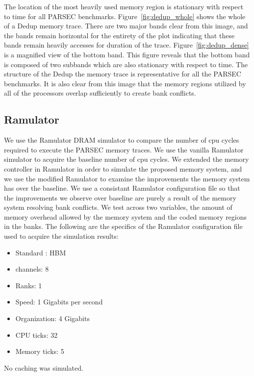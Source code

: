 The location of the most heavily used memory region is stationary with respect to time for all PARSEC benchmarks. Figure~\ref{fig:dedup_whole} shows the whole of a Dedup memory trace. There are two major bands clear from this image, and the bands remain horizontal for the entirety of the plot indicating that these bands remain heavily accesses for duration of the trace. Figure~\ref{fig:dedup_dense} is a magnified view of the bottom band. This figure reveals that the bottom band is composed of two subbands which are also stationary with respect to time. The structure of the Dedup the memory trace is representative for all the PARSEC benchmarks. It is also clear from this image that the memory regions utilized by all of the processors overlap sufficiently to create bank conflicts.

\subsection{Ramulator}

We use the Ramulator DRAM simulator to compare the number of cpu cycles required to execute the PARSEC memory traces. We use the vanilla Ramulator simulator to acquire the baseline number of cpu cycles. We extended the memory controller in Ramulator in order to simulate the proposed memory system, and we use the modified Ramulator to examine the improvements the memory system has over the baseline. We use a consistant Ramulator configuration file so that the improvements we observe over baseline are purely a result of the memory system resolving bank conflicts. We test across two variables, the amount of memory overhead allowed by the memory system and the coded memory regions in the banks. 
The following are the specifics of the Ramulator configuration file used to acquire the simulation results:
\begin{itemize}
\item Standard : HBM
\item channels: 8
\item Ranks: 1
\item Speed: 1 Gigabits per second
\item Organization: 4 Gigabits
\item CPU ticks: 32
\item Memory ticks: 5
\end{itemize}
No caching was simulated.